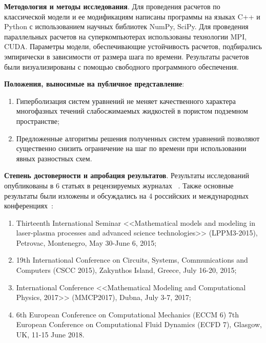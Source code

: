 \textbf{Методология и методы исследования}. Для проведения расчетов по классической модели и ее модификациям написаны программы на языках C++ и Python с использованием научных библиотек NumPy, SciPy. Для проведения параллельных расчетов на суперкомпьютерах использованы технологии MPI, CUDA.
Параметры модели, обеспечивающие устойчивость расчетов, подбирались эмпирически в зависимости от размера шага по времени.
Результаты расчетов были визуализированы с помощью свободного программного обеспечения.

\textbf{Положения, выносимые на публичное представление}:
\begin{enumerate}
 \item Гиперболизация систем уравнений не меняет качественного характера многофазных течений слабосжимаемых жидкостей в пористом подземном
пространстве;
 \item Предложенные алгоритмы решения полученных систем уравнений позволяют существенно снизить ограничение на шаг по времени при использовании явных разностных схем.
\end{enumerate}

\textbf{Степень достоверности и апробация результатов}. Результаты исследований опубликованы в 6 статьях в рецензируемых журналах
~\cite{matmod2014, matmod2015, preprint12016, preprint22016, preprint12018, preprint22018}. Также основные результаты были изложены и обсуждались на 4 российских и международных конференциях~\cite{proc13th, proc19th, proc2017, proc2018}:
\begin{enumerate}
 \item Thirteenth International Seminar <<Mathematical models and modeling in laser-plasma processes and advanced science technologies>> (LPPM3-2015), Petrovac, Montenegro, May 30-June 6, 2015;
 \item 19th International Conference on Circuits, Systems, Communications and Computers (CSCC 2015), Zakynthos Island, Greece, July 16-20, 2015;
 \item International Conference <<Mathematical Modeling and Computational Physics, 2017>> (MMCP2017), Dubna, July 3-7, 2017;
 \item 6th European Conference on Computational Mechanics (ECCM 6) 7th European Conference on Computational Fluid Dynamics (ECFD 7), Glasgow, UK, 11-15 June 2018.
\end{enumerate}
 
